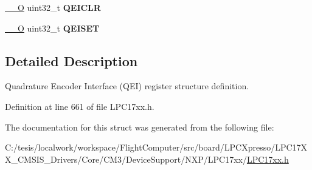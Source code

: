 \begin{DoxyCompactItemize}
\item 
\hypertarget{struct_l_p_c___q_e_i___type_def_ab9c41d1d9325018b2ac00b1141bde646}{\hyperlink{group___c_m_s_i_s__core__definitions_ga7e25d9380f9ef903923964322e71f2f6}{\-\_\-\-\_\-\-O} uint32\-\_\-t {\bfseries \-Q\-E\-I\-C\-L\-R}}\label{struct_l_p_c___q_e_i___type_def_ab9c41d1d9325018b2ac00b1141bde646}

\item 
\hypertarget{struct_l_p_c___q_e_i___type_def_a7b830cee15e2213ba5c569c1e5e0e026}{\hyperlink{group___c_m_s_i_s__core__definitions_ga7e25d9380f9ef903923964322e71f2f6}{\-\_\-\-\_\-\-O} uint32\-\_\-t {\bfseries \-Q\-E\-I\-S\-E\-T}}\label{struct_l_p_c___q_e_i___type_def_a7b830cee15e2213ba5c569c1e5e0e026}

\end{DoxyCompactItemize}


\subsection{\-Detailed \-Description}
\-Quadrature \-Encoder \-Interface (\-Q\-E\-I) register structure definition. 

\-Definition at line 661 of file \-L\-P\-C17xx.\-h.



\-The documentation for this struct was generated from the following file\-:\begin{DoxyCompactItemize}
\item 
\-C\-:/tesis/localwork/workspace/\-Flight\-Computer/src/board/\-L\-P\-C\-Xpresso/\-L\-P\-C17\-X\-X\-\_\-\-C\-M\-S\-I\-S\-\_\-\-Drivers/\-Core/\-C\-M3/\-Device\-Support/\-N\-X\-P/\-L\-P\-C17xx/\hyperlink{_l_p_c17xx_8h}{\-L\-P\-C17xx.\-h}\end{DoxyCompactItemize}
